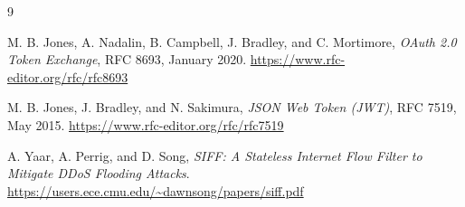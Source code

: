 \documentclass[11pt]{article}
\begin{document}
\begin{thebibliography}{9}

M. B. Jones, A. Nadalin, B. Campbell, J. Bradley, and C. Mortimore,
\emph{OAuth 2.0 Token Exchange},
RFC 8693, January 2020.
\url{https://www.rfc-editor.org/rfc/rfc8693}

M. B. Jones, J. Bradley, and N. Sakimura,
\emph{JSON Web Token (JWT)},
RFC 7519, May 2015.
\url{https://www.rfc-editor.org/rfc/rfc7519}

A. Yaar, A. Perrig, and D. Song,
\emph{SIFF: A Stateless Internet Flow Filter to Mitigate DDoS Flooding Attacks}.
\url{https://users.ece.cmu.edu/~dawnsong/papers/siff.pdf}

\end{thebibliography}
\end{document}
